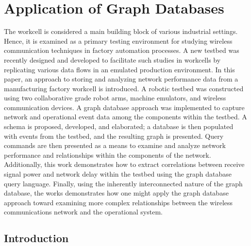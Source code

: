 
\chapter{Application of Graph Databases}\label{chapter:graphdb}

\chapterintro*

The workcell is considered a main building block of various industrial settings. Hence, it is examined as a primary testing environment for studying wireless communication techniques in factory automation processes. A new testbed was recently designed and developed to facilitate such studies in workcells by replicating various data flows in an emulated production environment. In this paper, an approach to storing and analyzing network performance data from a manufacturing factory workcell is introduced.  A robotic testbed was constructed using two collaborative grade robot arms, machine emulators, and wireless communication devices. A graph database approach was implemented to capture network and operational event data among the components within the testbed.  A schema is proposed, developed, and elaborated; a database is then populated with events from the testbed, and the resulting graph is presented. Query commands are then presented as a means to examine and analyze network performance and relationships within the components of the network.  Additionally, this work demonstrates how to extract correlations between receive signal power and network delay within the testbed using the graph database query language.  Finally, using the inherently interconnected nature of the graph database, the works demonstrates how one might apply the graph database approach toward examining more complex relationships between the wireless communications network and the operational system.

\section{Introduction} \label{gdbappl:sec::intro}

